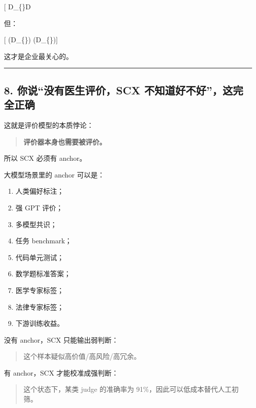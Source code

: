 \documentclass[
  12pt,
]{ctexart}
\providecommand{\tightlist}{%
  \setlength{\itemsep}{0pt}\setlength{\parskip}{0pt}}
\begin{document}
{[}
\textbar{}\mathcal D\_\{\}\textbar{}\ll \textbar{}\mathcal D\textbar{]}

但：

{[} (\mathcal D\_\{\}) \approx
{}(\mathcal D\_\{\}){]}

这才是企业最关心的。

\begin{center}\rule{0.5\linewidth}{0.5pt}\end{center}

\subsection{8. 你说``没有医生评价，SCX
不知道好不好''，这完全正确}\label{ux4f60ux8bf4ux6ca1ux6709ux533bux751fux8bc4ux4ef7scx-ux4e0dux77e5ux9053ux597dux4e0dux597dux8fd9ux5b8cux5168ux6b63ux786e}

这就是评价模型的本质悖论：

\begin{quote}
\textbf{评价器本身也需要被评价。}
\end{quote}

所以 SCX 必须有 anchor。

大模型场景里的 anchor 可以是：

\begin{enumerate}
\def\labelenumi{\arabic{enumi}.}
\tightlist
\item
  人类偏好标注；
\item
  强 GPT 评价；
\item
  多模型共识；
\item
  任务 benchmark；
\item
  代码单元测试；
\item
  数学题标准答案；
\item
  医学专家标签；
\item
  法律专家标签；
\item
  下游训练收益。
\end{enumerate}

没有 anchor，SCX 只能输出弱判断：

\begin{quote}
这个样本疑似高价值/高风险/高冗余。
\end{quote}

有 anchor，SCX 才能校准成强判断：

\begin{quote}
这个状态下，某类 judge 的准确率为 91\%，因此可以低成本替代人工初筛。
\end{quote}
\end{document}
